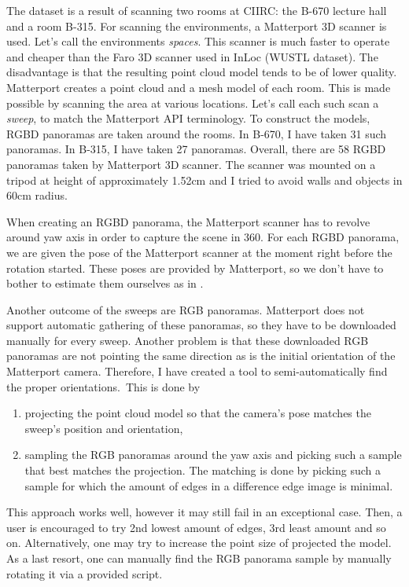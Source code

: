 \documentclass[twoside]{ctuthesis}
\theoremstyle{plain}
\theoremstyle{definition}
\theoremstyle{note}
\begin{document}
The dataset is a result of scanning two rooms at CIIRC: the B-670 lecture hall and a room B-315. For scanning the environments, a Matterport 3D scanner is used. Let's call the environments \emph{spaces}. This scanner is much faster to operate and cheaper than the Faro 3D scanner used in InLoc (WUSTL dataset). The disadvantage is that the resulting point cloud model tends to be of lower quality. Matterport creates a point cloud and a mesh model of each room. This is made possible by scanning the area at various locations. Let's call each such scan a \emph{sweep}, to match the Matterport API terminology. To construct the models, RGBD panoramas are taken around the rooms. In B-670, I have taken 31 such panoramas. In B-315, I have taken 27 panoramas. Overall, there are 58 RGBD panoramas taken by Matterport 3D scanner. The scanner was mounted on a tripod at height of approximately 1.52cm and I tried to avoid walls and objects in 60cm radius.

When creating an RGBD panorama, the Matterport scanner has to revolve around yaw axis in order to capture the scene in 360\degree. For each RGBD panorama, we are given the pose of the Matterport scanner at the moment right before the rotation started. These poses are provided by Matterport, so we don't have to bother to estimate them ourselves as in \cite{wijmans17rgbd}.

Another outcome of the sweeps are RGB panoramas. Matterport does not support automatic gathering of these panoramas, so they have to be downloaded manually for every sweep. Another problem is that these downloaded RGB panoramas are not pointing the same direction as is the initial orientation of the Matterport camera. Therefore, I have created a tool to semi-automatically find the proper orientations. This is done by

\begin{enumerate}
	\item projecting the point cloud model so that the camera's pose matches the sweep's position and orientation,
	\item sampling the RGB panoramas around the yaw axis and picking such a sample that best matches the projection. The matching is done by picking such a sample for which the amount of edges in a difference edge image is minimal.
\end{enumerate}

This approach works well, however it may still fail in an exceptional case. Then, a user is encouraged to try 2nd lowest amount of edges, 3rd least amount and so on. Alternatively, one may try to increase the point size of projected the model. As a last resort, one can manually find the RGB panorama sample by manually rotating it via a provided script.
\end{document}
